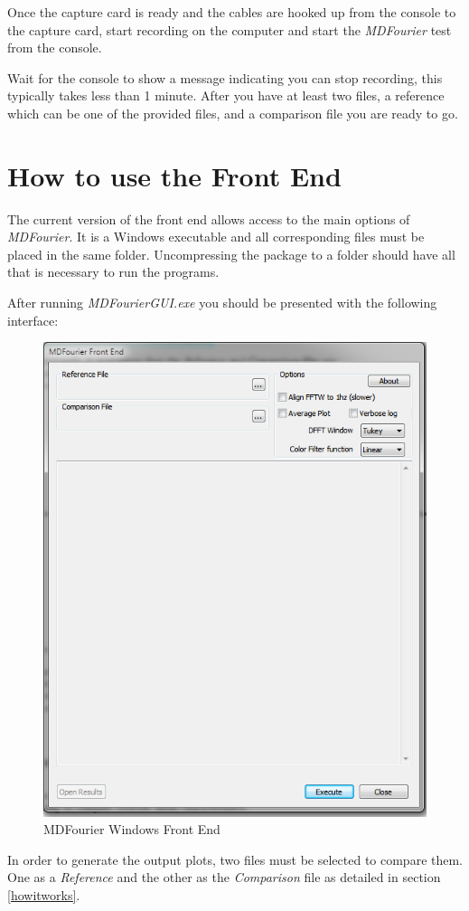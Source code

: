 \documentclass[10pt,a4paper]{report}
\begin{document}
Once the capture card is ready and the cables are hooked up from the console to the capture card, start recording on the computer and start the \textit{MDFourier} test from the console.

Wait for the console to show a message indicating you can stop recording, this typically takes less than 1 minute. After you have at least two files, a reference which can be one of the provided files, and a comparison file you are ready to go. 

\chapter{How to use the Front End}
\label{usinggui}
The current version of the front end allows access to the main options of \textit{MDFourier}. It is a Windows executable and all corresponding files must be placed in the same folder. Uncompressing the package to a folder should have all that is necessary to run the programs.

After running \textit{MDFourierGUI.exe} you should be presented with the following interface:

\begin{figure}[H]
	\centering
	\includegraphics[width=0.6\linewidth]{plots/GUI1.png}
	\caption[Front End]{MDFourier Windows Front End}
	\label{fig:gui1}
\end{figure}

In order to generate the output plots, two files must be selected to compare them. One as a \textit{Reference} and the other as the \textit{Comparison} file as detailed in section \ref{howitworks}.
\end{document}
